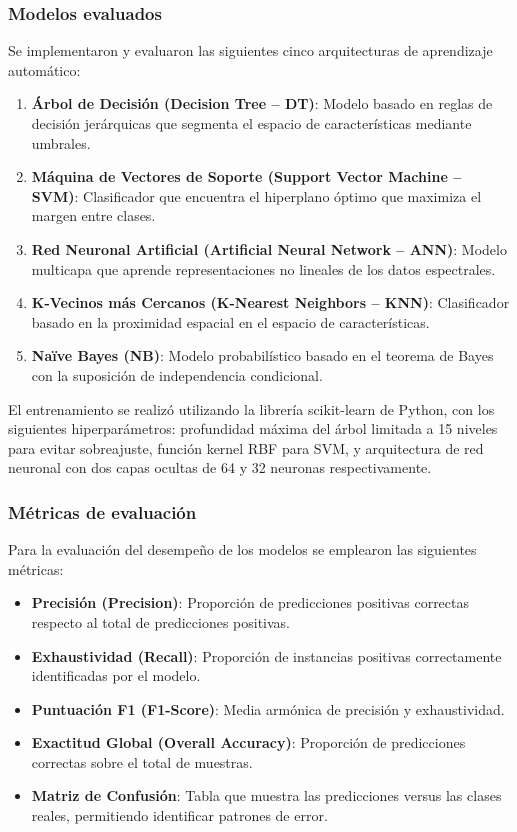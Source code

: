 \documentclass[12pt, a4paper]{article}
\begin{document}
\subsubsection*{Modelos evaluados}

Se implementaron y evaluaron las siguientes cinco arquitecturas de aprendizaje automático:

\begin{enumerate}
    \item \textbf{Árbol de Decisión (Decision Tree -- DT)}: Modelo basado en reglas de
    decisión jerárquicas que segmenta el espacio de características mediante umbrales.
    \item \textbf{Máquina de Vectores de Soporte (Support Vector Machine -- SVM)}:
    Clasificador que encuentra el hiperplano óptimo que maximiza el margen entre clases.
    \item \textbf{Red Neuronal Artificial (Artificial Neural Network -- ANN)}: Modelo
    multicapa que aprende representaciones no lineales de los datos espectrales.
    \item \textbf{K-Vecinos más Cercanos (K-Nearest Neighbors -- KNN)}: Clasificador
    basado en la proximidad espacial en el espacio de características.
    \item \textbf{Naïve Bayes (NB)}: Modelo probabilístico basado en el teorema de Bayes
    con la suposición de independencia condicional.
\end{enumerate}

El entrenamiento se realizó utilizando la librería scikit-learn de Python, con los
siguientes hiperparámetros: profundidad máxima del árbol limitada a 15 niveles para
evitar sobreajuste, función kernel RBF para SVM, y arquitectura de red neuronal con dos
capas ocultas de 64 y 32 neuronas respectivamente.

\subsubsection*{Métricas de evaluación}

Para la evaluación del desempeño de los modelos se emplearon las siguientes métricas:

\begin{itemize}
    \item \textbf{Precisión (Precision)}: Proporción de predicciones positivas correctas
    respecto al total de predicciones positivas.
    \item \textbf{Exhaustividad (Recall)}: Proporción de instancias positivas correctamente
    identificadas por el modelo.
    \item \textbf{Puntuación F1 (F1-Score)}: Media armónica de precisión y exhaustividad.
    \item \textbf{Exactitud Global (Overall Accuracy)}: Proporción de predicciones
    correctas sobre el total de muestras.
    \item \textbf{Matriz de Confusión}: Tabla que muestra las predicciones versus las
    clases reales, permitiendo identificar patrones de error.
\end{itemize}
\end{document}
